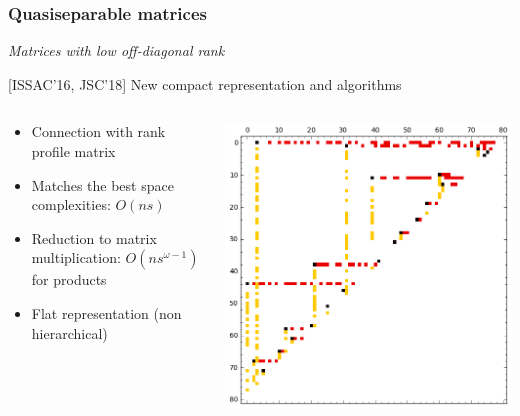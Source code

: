 \documentclass{beamer}
\begin{document}
\begin{frame}
  \frametitle{Quasiseparable matrices }
  \begin{center}
    \textit{Matrices with low off-diagonal rank}
  \end{center}

  \begin{block}
    {[ISSAC'16, JSC'18] New compact representation and algorithms}
  \begin{columns}
    \begin{column}{.65\textwidth}
    \begin{itemize}
    \item Connection with rank profile matrix
    \item Matches the best space complexities: $O(ns)$
    \item Reduction to matrix multiplication: $O(ns^{\omega-1})$ for products
    \item Flat representation (non hierarchical)
    \end{itemize}
    \end{column}
    \begin{column}{.3\textwidth}
      \includegraphics[width=\textwidth]{Bruhat}
    \end{column}
  \end{columns}
  \end{block}

\end{frame}
\end{document}
